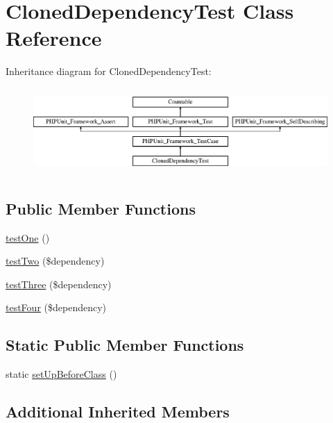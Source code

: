 \hypertarget{class_cloned_dependency_test}{}\section{Cloned\+Dependency\+Test Class Reference}
\label{class_cloned_dependency_test}
Inheritance diagram for Cloned\+Dependency\+Test\+:\begin{figure}[H]
\begin{center}
\leavevmode
\includegraphics[height=3.303835cm]{class_cloned_dependency_test}
\end{center}
\end{figure}
\subsection*{Public Member Functions}
\begin{DoxyCompactItemize}
\item 
\mbox{\hyperlink{class_cloned_dependency_test_afbf3ff88b322c6a7197ce02297cd23a0}{test\+One}} ()
\item 
\mbox{\hyperlink{class_cloned_dependency_test_a6c27592c146d2e7e639cf0561baec72f}{test\+Two}} (\$dependency)
\item 
\mbox{\hyperlink{class_cloned_dependency_test_ae46abdb6cf6eb25f61a0f2d8f8c9e601}{test\+Three}} (\$dependency)
\item 
\mbox{\hyperlink{class_cloned_dependency_test_a5fb1c2ddd009faf0d09e63c70677e671}{test\+Four}} (\$dependency)
\end{DoxyCompactItemize}
\subsection*{Static Public Member Functions}
\begin{DoxyCompactItemize}
\item 
static \mbox{\hyperlink{class_cloned_dependency_test_a80ef9eb20e7443b38276fb4647985fb7}{set\+Up\+Before\+Class}} ()
\end{DoxyCompactItemize}
\subsection*{Additional Inherited Members}


